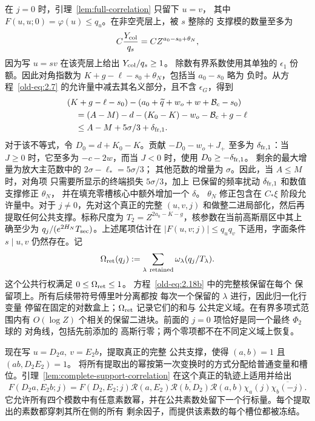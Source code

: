 \documentclass[11pt,a4paper]{article}
\numberwithin{equation}{section}
\numberwithin{figure}{section}
\theoremstyle{definition}
\theoremstyle{remark}
\begin{document}
在 \(j=0\) 时，引理~\ref{lem:full-correlation} 只留下 \(u=v\)，
其中 \(F(u,u;0)=\varphi(u)\le q_u\)。在非空壳层上，被 \(s\) 整除的
支撑模的数量至多为
\[
 C\frac{Y_{\rm col}}{q_s}=C Z^{a_0-s_0+\theta_N},
\]
因为写 \(u=sv\) 在该壳层上给出 \(Y_{\rm col}/q_s\ge1\)。
除数有界系数使用其单独的 \(\epsilon_1\)
份额。因此对角指数为
\(K+g-\ell-s_0+\theta_N\)，包括当 \(a_0-s_0\) 略为
负时。从方程~\eqref{old-eq:2.7} 的允许量中减去其名义部分，且不含 \(\epsilon_G\)，得到
\begin{equation}
 \begin{split}
 &(K+g-\ell-s_0)
 -(a_0+\widetilde q+w_o+w+\mathcal B_c-s_0)\\
 &\quad=(A-M)-d-(K_0-K)-w_o-\mathcal B_c+g-\ell\\
 &\quad\le A-M+5\sigma/3+\delta_{{\rm fr},1}.
 \end{split}
 \label{old-eq:2.12}
\end{equation}
对于该不等式，令 \(D_0=d+K_0-K\)。贡献
\(-D_0-w_o+J_+\) 至多为 \(\delta_{{\rm fr},1}\)：当 \(J\ge0\) 时，它至多为
\(-c-2w\)，而当 \(J<0\) 时，使用
\(D_0\ge-\delta_{{\rm fr},1}\)。
剩余的最大增量为放大主范数中的
\(2\sigma-\ell_*=5\sigma/3\)；
其他范数的增量为 \(\sigma\)。因此，当 \(A\le M\) 时，对角项
只需要所显示的终端损失 \(5\sigma/3\)，加上
已保留的频率扰动 \(\delta_{{\rm fr},1}\)
和数值支撑修正 \(\theta_N\)，
并在填充零槽核心中额外增加一个 \(\delta\)。
\(\theta_N\) 修正包含在 \(C_*\xi\) 阶段允许量中。对于 \(j\ne0\)，先对这个真正的完整 \((u,v,j)\) 和做整二进局部化，然后再提取任何公共支撑。标称尺度为
\(T_2=Z^{2a_0-K-g}\)，核参数在当前高斯扇区中其上确至少为
\(q_j/(e^{2H_N}T_{\rm sec})\)。上述尾项估计在
\(|F(u,v;j)|\le q_uq_v\) 下适用，字面条件
\(s\mid u,v\) 仍然存在。记
\[
 \Omega_{\rm ret}(q_j)
 :=\sum_{\lambda\ {\rm retained}}\omega_\lambda(q_j/T_\lambda).
\]
这个公共行权满足 \(0\le\Omega_{\rm ret}\le1\)。
方程~\eqref{old-eq:2.18b} 中的完整核保留在每个
保留项上。所有后续带符号傅里叶分离都按
每次一个保留的 \(\lambda\) 进行，因此归一化行变量
停留在固定的对数盒上；\(\Omega_{\rm ret}\) 记录它们的和与
公共定义域。在有界多项式范围内有 \(O(\log Z)\) 个相关的保留二进块。前面的 \(j=0\) 项恰好是同一个最终 \(\Phi_2\) 球的
对角线，包括先前添加的
高斯行零；两个零项都不在不同定义域上恢复。

现在写 \(u=D_2a,\ v=E_2b\)，提取真正的完整
公共支撑，使得 \((a,b)=1\) 且 \((ab,D_2E_2)=1\)。
将所有提取出的幂按第一次变换时的方式分配给普通变量和槽位。引理~\ref{lem:complete-support-correlation} 在这个真正的轨迹上适用并给出
\[
 F(D_2a,E_2b;j)=F(D_2,E_2;j)\mathcal R(a,E_2)
   \overline{\mathcal R(b,D_2)}\mathcal R(a,b)
   \chi_a(j)\overline{\chi_b(-j)}.
\]
它允许所有四个模数中有任意素数幂，并在公共素数处留下一个行标量。每个提取出的素数都穿刺其所在侧的所有
剩余因子，而提供该素数的每个槽位都被冻结。
\end{document}
